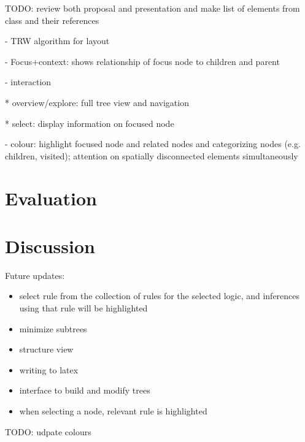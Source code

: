 \documentclass[conference]{IEEEtran}
\begin{document}

TODO: review both proposal and presentation and make list of elements from class and their references

- TRW algorithm for layout

- Focus+context: shows relationship of focus node to children and parent

- interaction

  * overview/explore: full tree view and navigation

  * select: display information on focused node

- colour: highlight focused node and related nodes and categorizing nodes (e.g. children, visited); attention on spatially disconnected elements simultaneously

\section{Evaluation}
\label{sec:evaluation}


\section{Discussion}
\label{sec:discussion}


Future updates:

\begin{itemize}
    \item select rule from the collection of rules for the selected logic, and inferences using that rule will be highlighted
    \item minimize subtrees
    \item structure view
    \item writing to latex
    \item interface to build and modify trees
    \item when selecting a node, relevant rule is highlighted
\end{itemize}

TODO: udpate colours \\
\end{document}
